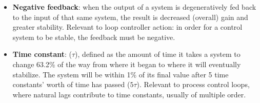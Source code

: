 \begin{itemize}
\item \textbf{Negative feedback}: when the output of a system is degeneratively fed back to the input of that same system, the result is decreased (overall) gain and greater stability.  Relevant to loop controller action: in order for a control system to be stable, the feedback must be negative.
\item \textbf{Time constant}: ($\tau$), defined as the amount of time it takes a system to change 63.2\% of the way from where it began to where it will eventually stabilize.  The system will be within 1\% of its final value after 5 time constants' worth of time has passed ($5 \tau$).  Relevant to process control loops, where natural lags contribute to time constants, usually of multiple order.

\end{itemize}
